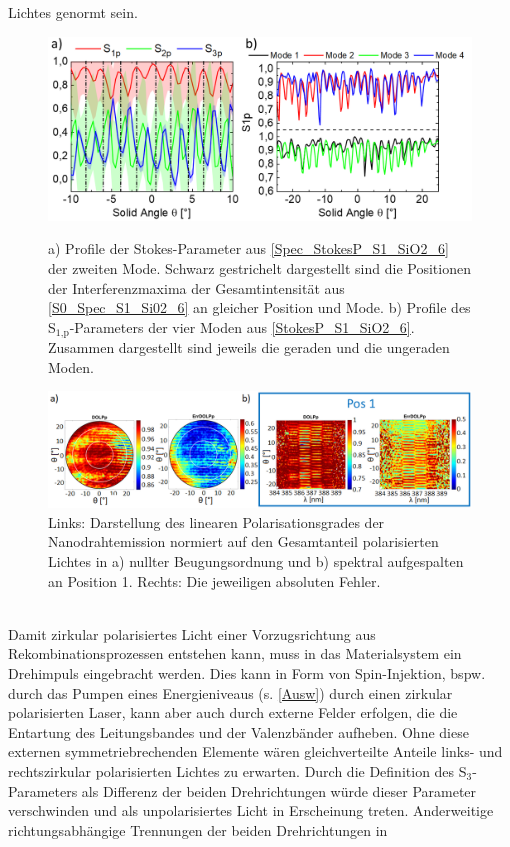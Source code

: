 Lichtes genormt sein.\begin{figure}[b]
\includegraphics[width=.66\textwidth]{Bilder/SiO2/SpecP1_StokesP_Line_S1_Si02_6}
\caption{a) Profile der Stokes-Parameter aus \autoref{Spec_StokesP_S1_SiO2_6}
der zweiten Mode. Schwarz gestrichelt dargestellt sind die Positionen der
Interferenzmaxima der Gesamtintensität aus \autoref{S0_Spec_S1_Si02_6} an
gleicher Position und Mode. b) Profile des S$_\text{1,p}$-Parameters der vier
Moden aus \autoref{StokesP_S1_SiO2_6}. Zusammen dargestellt sind jeweils die
geraden und die ungeraden Moden.} \label{SpecP1_StokesP_Line_S1_Si02_6}
\includegraphics[width=1\textwidth]{Bilder/SiO2/DOLP_SiO2_S1_6} \caption{Links:
Darstellung des linearen Polarisationsgrades der Nanodrahtemission normiert auf
den Gesamtanteil polarisierten Lichtes in a) nullter Beugungsordnung und b)
spektral aufgespalten an Position 1. Rechts: Die jeweiligen absoluten Fehler.}
\label{DOLP_S1_SiO2_6} \end{figure} \\Damit zirkular polarisiertes Licht einer
Vorzugsrichtung aus Rekombinationsprozessen entstehen kann, muss in das
Materialsystem ein Drehimpuls eingebracht werden. Dies kann in Form von
Spin-Injektion, bspw. durch  das Pumpen eines Energieniveaus (s. \autoref{Ausw})
durch einen zirkular polarisierten Laser, kann aber auch durch externe Felder
erfolgen, die die Entartung des Leitungsbandes und der Valenzbänder aufheben.
Ohne diese externen symmetriebrechenden Elemente wären gleichverteilte Anteile
links- und rechtszirkular polarisierten Lichtes zu erwarten. Durch die
Definition des S$_\text{3}$-Parameters als Differenz der beiden Drehrichtungen
würde dieser Parameter verschwinden und als unpolarisiertes Licht in Erscheinung
treten. Anderweitige richtungsabhängige Trennungen der beiden Drehrichtungen in
